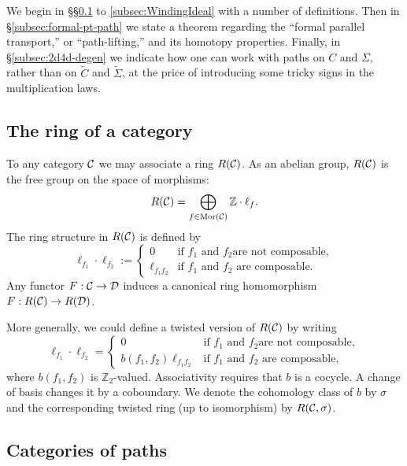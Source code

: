 \documentclass[11pt,a4paper]{article}
\def\IZ{{\mathbb{Z}}}
\def\Z{{\mathbb{Z}}}
\def\CC {{\cal C}}
\def\CD {{\cal D}}
\def\IZ{{\mathbb{Z}}}
\def\CC {{\cal C}}
\def\CD {{\cal D}}
\begin{document}
We begin in \S\S \ref{subsec:Ring-Category}  to \ref{subsec:WindingIdeal} with
a number of definitions.  Then in \S\ref{subsec:formal-pt-path} we state a
theorem regarding the ``formal parallel transport,'' or ``path-lifting,''
and its homotopy properties.
Finally, in \S\ref{subsec:2d4d-degen} we indicate how one can work
with paths on $C$ and $\Sigma$, rather than on $\tilde C$ and $\tilde \Sigma$,
at the price of introducing some tricky signs in the multiplication laws.



\subsection{The ring of a category}\label{subsec:Ring-Category}

To any category $\CC$ we may associate a ring $R(\CC)$.
As an abelian group, $R(\CC)$ is the free group on the
space of morphisms:
\begin{equation}
R(\CC) = \bigoplus_{f \in {\mathrm{Mor}}(\CC)} \IZ \cdot \ell_f .
\end{equation}
The ring structure in $R(\CC)$ is defined by
\begin{equation}
\ell_{f_1} \cdot \ell_{f_2} := \begin{cases} 0 & \text{if $f_1$ and $f_2$
are not composable}, \\
\ell_{f_1 f_2} & \text{if $f_1$ and $f_2$ are composable.}
\end{cases}
\end{equation}
Any functor $F:\CC \to \CD$
induces a canonical ring homomorphism $F: R(\CC) \to R(\CD)$.

More generally,
we could define a twisted version of $R(\CC)$ by writing
\begin{equation}
\ell_{f_1} \cdot \ell_{f_2} = \begin{cases} 0 & \text{if $f_1$ and $f_2$
are not composable}, \\
b(f_1, f_2) \ell_{f_1 f_2} & \text{if $f_1$ and $f_2$ are composable,}
\end{cases}
\end{equation}
where $b(f_1, f_2)$ is $\Z_2$-valued.
Associativity requires that $b$ is a cocycle.  A change
of basis changes it by a coboundary.  We denote the cohomology class of $b$ by $\sigma$ and the
corresponding twisted ring (up to isomorphism) by $R(\CC,\sigma)$.



\subsection{Categories of paths}\label{subsec:Category-Path}
\end{document}
